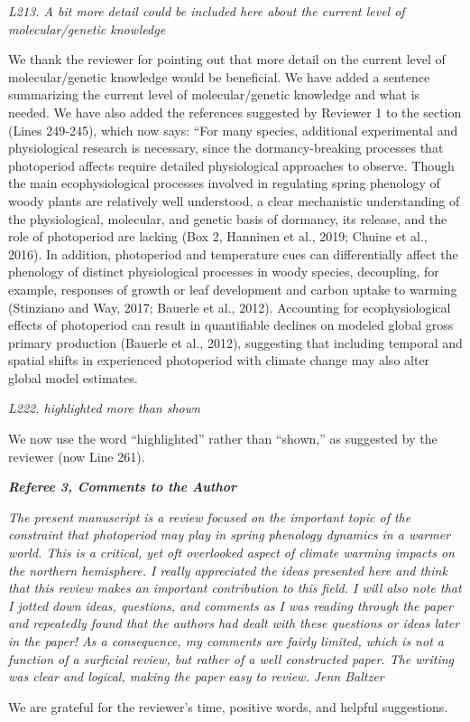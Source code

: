 \documentclass{article}
\begin{document}
\par \emph{L213. A bit more detail could be included here about the current level of molecular/genetic knowledge}
\par We thank the reviewer for pointing out that more detail on the current level of molecular/genetic knowledge would be beneficial. We have added a sentence summarizing the current level of molecular/genetic knowledge and what is needed. We have also added the references suggested by Reviewer 1 to the section (Lines 249-245), which now says:
``For many species, additional experimental and physiological research is necessary, since the dormancy-breaking processes that photoperiod affects require detailed physiological approaches to observe. Though the main ecophysiological processes involved in regulating spring phenology of woody plants are relatively well understood, a clear mechanistic understanding of the physiological, molecular, and genetic basis of dormancy, its release, and the role of photoperiod are lacking  (Box 2, Hanninen et al., 2019; Chuine et al., 2016). In addition, photoperiod and temperature cues can differentially affect the phenology of distinct physiological processes in woody species, decoupling, for example, responses of growth or leaf development and carbon uptake to warming (Stinziano and Way, 2017; Bauerle et al., 2012). Accounting for ecophysiological effects of photoperiod can result in quantifiable declines on modeled global gross primary production (Bauerle et al., 2012), suggesting that including temporal and spatial shifts in experienced photoperiod with climate change may also alter global model estimates.
\par \emph{L222. highlighted more than shown}
\par We now use the word ``highlighted'' rather than ``shown,'' as suggested by the reviewer (now Line 261).

\emph{{\bf Referee 3, Comments to the Author}}
\par \emph{The present manuscript is a review focused on the important topic of the constraint that photoperiod may play in spring phenology dynamics in a warmer world. This is a critical, yet oft overlooked aspect of climate warming impacts on the northern hemisphere. I really appreciated the ideas presented here and think that this review makes an important contribution to this field. I will also note that I jotted down ideas, questions, and comments as I was reading through the paper and repeatedly found that the authors had dealt with these questions or ideas later in the paper! As a consequence, my comments are fairly limited, which is not a function of a surficial review, but rather of a well constructed paper. The writing was clear and logical, making the paper easy to review. Jenn Baltzer}
\par We are grateful for the reviewer's time, positive words, and helpful suggestions.
\end{document}
